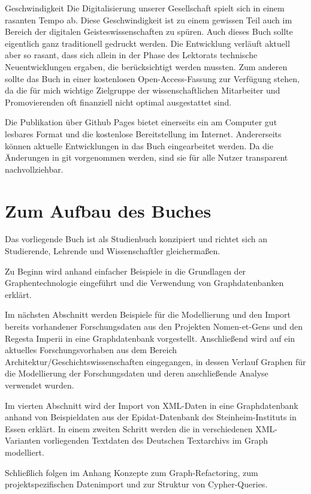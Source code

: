 \documentclass[ngerman,]{scrreprt}
\begin{document}
Geschwindigkeit Die Digitalisierung unserer Gesellschaft spielt sich in einem rasanten Tempo ab. Diese Geschwindigkeit ist zu einem gewissen Teil auch im Bereich der digitalen Geisteswissenschaften zu spüren. Auch dieses Buch sollte eigentlich ganz traditionell gedruckt werden. Die Entwicklung verläuft aktuell aber so rasant, dass sich allein in der Phase des Lektorats technische Neuentwicklungen ergaben, die berücksichtigt werden mussten. Zum anderen sollte das Buch in einer kostenlosen Open-Access-Fassung zur Verfügung stehen, da die für mich wichtige Zielgruppe der wissenschaftlichen Mitarbeiter und Promovierenden oft finanziell nicht optimal ausgestattet sind.

Die Publikation über Github Pages bietet einerseits ein am Computer gut lesbares Format und die kostenlose Bereitstellung im Internet. Andererseits können aktuelle Entwicklungen in das Buch eingearbeitet werden. Da die Änderungen in git vorgenommen werden, sind sie für alle Nutzer transparent nachvollziehbar.

\section{Zum Aufbau des Buches}\label{zum-aufbau-des-buches}

Das vorliegende Buch ist als Studienbuch konzipiert und richtet sich an Studierende, Lehrende und Wissenschaftler gleichermaßen.

Zu Beginn wird anhand einfacher Beispiele in die Grundlagen der Graphentechnologie eingeführt und die Verwendung von Graphdatenbanken erklärt.

Im nächsten Abschnitt werden Beispiele für die Modellierung und den Import bereits vorhandener Forschungsdaten aus den Projekten Nomen-et-Gens und den Regesta Imperii in eine Graphdatenbank vorgestellt. Anschließend wird auf ein aktuelles Forschungsvorhaben aus dem Bereich Architektur/Geschichtswissenschaften eingegangen, in dessen Verlauf Graphen für die Modellierung der Forschungsdaten und deren anschließende Analyse verwendet wurden.

Im vierten Abschnitt wird der Import von XML-Daten in eine Graphdatenbank anhand von Beispieldaten aus der Epidat-Datenbank des Steinheim-Instituts in Essen erklärt. In einem zweiten Schritt werden die in verschiedenen XML-Varianten vorliegenden Textdaten des Deutschen Textarchivs im Graph modelliert.

Schließlich folgen im Anhang Konzepte zum Graph-Refactoring, zum projektspezifischen Datenimport und zur Struktur von Cypher-Queries.
\end{document}
